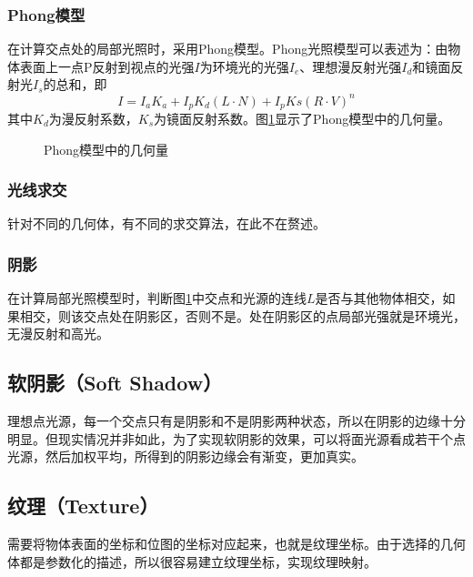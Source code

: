 \documentclass{article}
\begin{document}
\subsubsection{Phong模型}
在计算交点处的局部光照时，采用Phong模型。Phong光照模型可以表述为：由物体表面上一点P反射到视点的光强$I$为环境光的光强$I_e$、理想漫反射光强$I_d$和镜面反射光$I_s$的总和，即$$I=I_aK_a+I_pK_d(L\cdot N)+I_pKs(R\cdot V)^n$$其中$K_d$为漫反射系数，$K_s$为镜面反射系数。图\ref{fig:phong}显示了Phong模型中的几何量。
\begin{figure}[H]
\centering
{}
\caption{Phong模型中的几何量}
\label{fig:phong}
\end{figure}
\subsubsection{光线求交}
针对不同的几何体，有不同的求交算法，在此不在赘述。
\subsubsection{阴影}\label{sec:shadow}
在计算局部光照模型时，判断图\ref{fig:phong}中交点和光源的连线$L$是否与其他物体相交，如果相交，则该交点处在阴影区，否则不是。处在阴影区的点局部光强就是环境光，无漫反射和高光。
\subsection{软阴影（Soft Shadow）}\label{sec:softshadow}
理想点光源，每一个交点只有是阴影和不是阴影两种状态，所以在阴影的边缘十分明显。但现实情况并非如此，为了实现软阴影的效果，可以将面光源看成若干个点光源，然后加权平均，所得到的阴影边缘会有渐变，更加真实。
\subsection{纹理（Texture）}
需要将物体表面的坐标和位图的坐标对应起来，也就是纹理坐标。由于选择的几何体都是参数化的描述，所以很容易建立纹理坐标，实现纹理映射。
\end{document}

